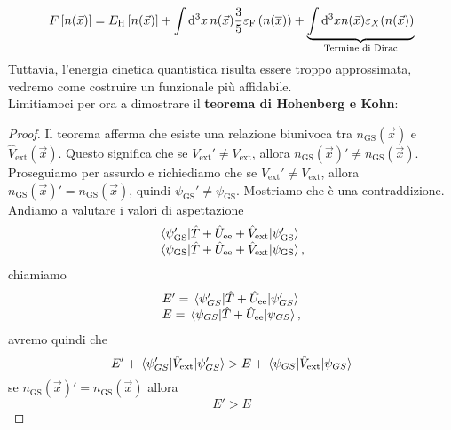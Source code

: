 \begin{equation*}
    F\left[n(\vec x)\right]=E_{\text H}\left[n(\vec x)\right]+\int \dd[3]{x} n(\vec x) \frac 35 \varepsilon_{\text F}\left(n(\overline x)\right)+\underbrace{\int \dd[3]x n(\vec x)\varepsilon_X(n(\vec x))}_{\text{Termine di Dirac}}
\end{equation*}
Tuttavia, l'energia cinetica quantistica risulta essere troppo approssimata, vedremo come costruire un funzionale più affidabile.\\
Limitiamoci per ora a dimostrare il \textbf{teorema di Hohenberg e Kohn}:
\begin{proof}
    Il teorema afferma che esiste una relazione biunivoca tra $n_{\text{GS}}(\vec x)$ e $\hat V_{\text{ext}}(\vec x)$. Questo significa che se $V_{\text{ext}}'\neq V_{\text{ext}}$, allora $n_{\text{GS}}(\vec x)'\neq n_{\text{GS}}(\vec x)$. Proseguiamo per assurdo e richiediamo che se $V_{\text{ext}}'\neq V_{\text{ext}}$, allora $n_{\text{GS}}(\vec x)' = n_{\text{GS}}(\vec x)$, quindi $\psi_{\text{GS}}'\neq \psi_{\text{GS}}$. Mostriamo che è una contraddizione.\\
    Andiamo a valutare i valori di aspettazione
    \begin{equation*}
        \begin{array}{l}
            \mel{\psi_{\text{GS}}'}{\hat T+ \hat U_{\text{ee}}+\hat V_{\text{ext}}}{\psi_{\text{GS}}'} \\
            \mel{\psi_{\text{GS}}}{\hat T+ \hat U_{\text{ee}}+\hat V_{\text{ext}}}{\psi_{\text{GS}}},
        \end{array}
    \end{equation*}
    chiamiamo
    \begin{equation*}
        \begin{array}{l}
            E'=\mel{\psi_{GS}'}{\hat T + \hat U_{\text{ee}}}{\psi_{GS}'} \\
            E=\mel{\psi_{GS}}{\hat T + \hat U_{\text{ee}}}{\psi_{GS}},
        \end{array}
    \end{equation*}
    avremo quindi che
    \begin{equation*}
        E'+\mel{\psi_{GS}'}{\hat V_{\text{ext}}}{\psi_{GS}'} > E+\mel{\psi_{GS}}{\hat V_{\text{ext}}}{\psi_{GS}}
    \end{equation*}
    se $n_{\text{GS}}(\vec x)' = n_{\text{GS}}(\vec x)$ allora
    \begin{equation*}
        E' > E
    \end{equation*}

\end{proof}
